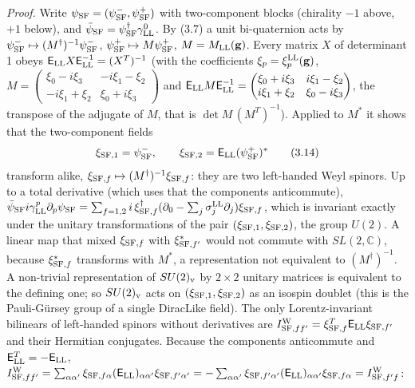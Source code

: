 \documentclass[
  10pt,
]{article}
\begin{document}
\emph{Proof.} Write \(\psi_{\rm SF}=(\psi^-_{\rm SF},\psi^+_{\rm SF})\)
with two-component blocks (chirality \(-1\) above, \(+1\) below), and
\(\bar\psi_{\rm SF}=\psi_{\rm SF}^\dagger\gamma^0_{\rm LL}\). By (3.7) a
unit bi-quaternion acts by
\(\psi^-_{\rm SF}\mapsto(M^\dagger)^{-1}\psi^-_{\rm SF}\),
\(\psi^+_{\rm SF}\mapsto M\psi^+_{\rm SF}\),
\(M=M_{\rm LL}(\mathbf g)\). Every matrix \(X\) of determinant 1 obeys
\(\mathsf E_{\rm LL}X\mathsf E_{\rm LL}^{-1}=(X^T)^{-1}\) (with the
coefficients \(\xi_p=\xi^{\rm LL}_p(\mathbf g)\),
\(M=\begin{pmatrix}\xi_0-i\xi_3&-i\xi_1-\xi_2\\-i\xi_1+\xi_2&\xi_0+i\xi_3\end{pmatrix}\)
and
\(\mathsf E_{\rm LL}M\mathsf E_{\rm LL}^{-1}=\begin{pmatrix}\xi_0+i\xi_3&i\xi_1-\xi_2\\i\xi_1+\xi_2&\xi_0-i\xi_3\end{pmatrix}\),
the transpose of the adjugate of \(M\), that is \(\det M\,(M^T)^{-1}\)).
Applied to \(M^*\) it shows that the two-component fields
\[\xi_{{\rm SF},1}=\psi^-_{\rm SF},\qquad\xi_{{\rm SF},2}=\mathsf E_{\rm LL}(\psi^+_{\rm SF})^*\tag{3.14}\]
transform alike,
\(\xi_{{\rm SF},f}\mapsto(M^\dagger)^{-1}\xi_{{\rm SF},f}\): they are
two left-handed Weyl spinors. Up to a total derivative (which uses that
the components anticommute),
\(\bar\psi_{\rm SF}i\gamma^p_{\rm LL}\partial_p\psi_{\rm SF}=\sum_{f=1,2}i\,\xi_{{\rm SF},f}^\dagger(\partial_0-\sum_j\sigma^{\rm LL}_j\partial_j)\xi_{{\rm SF},f}\),
which is invariant exactly under the unitary transformations of the pair
\((\xi_{{\rm SF},1},\xi_{{\rm SF},2})\), the group \(U(2)\). A linear
map that mixed \(\xi_{{\rm SF},f}\) with \(\xi_{{\rm SF},f'}^*\) would
not commute with \(SL(2,\mathbb C)\), because \(\xi_{{\rm SF},f}^*\)
transforms with \(M^*\), a representation not equivalent to
\((M^\dagger)^{-1}\). A non-trivial representation of \(SU(2)_{\rm v}\)
by \(2\times2\) unitary matrices is equivalent to the defining one; so
\(SU(2)_{\rm v}\) acts on \((\xi_{{\rm SF},1},\xi_{{\rm SF},2})\) as an
isospin doublet (this is the Pauli-Gürsey group of a single DiracLike
field). The only Lorentz-invariant bilinears of left-handed spinors
without derivatives are
\(I^{\rm W}_{{\rm SF},ff'}=\xi_{{\rm SF},f}^T\mathsf E_{\rm LL}\xi_{{\rm SF},f'}\)
and their Hermitian conjugates. Because the components anticommute and
\(\mathsf E_{\rm LL}^T=-\mathsf E_{\rm LL}\),
\(I^{\rm W}_{{\rm SF},ff'}=\sum_{\alpha\alpha'}\xi_{{\rm SF},f\alpha}(\mathsf E_{\rm LL})_{\alpha\alpha'}\xi_{{\rm SF},f'\alpha'}=-\sum_{\alpha\alpha'}\xi_{{\rm SF},f'\alpha'}(\mathsf E_{\rm LL})_{\alpha\alpha'}\xi_{{\rm SF},f\alpha}=I^{\rm W}_{{\rm SF},f'f}\):
\end{document}
